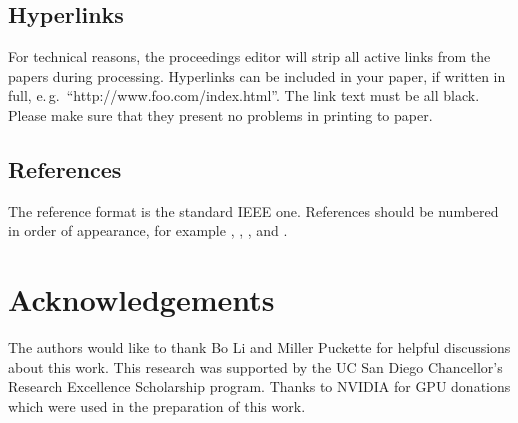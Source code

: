 \documentclass[a4paper]{article}
\begin{document}

\subsection{Hyperlinks}

For technical reasons, the proceedings editor will strip all active links from the papers during processing. Hyperlinks can be included in your paper, if written in full, e.\,g.\ ``http://www.foo.com/index.html''. The link text must be all black. 
Please make sure that they present no problems in printing to paper.

\subsection{References}

The reference format is the standard IEEE one. References should be numbered in order of appearance, for example \cite{Davis80-COP}, \cite{Rabiner89-ATO}, \cite[pp.\ 417--422]{Hastie09-TEO}, and \cite{YourName17-XXX}.

\section{Acknowledgements}

The authors would like to thank Bo Li and Miller Puckette for helpful discussions about this work. 
This research was supported by the UC San Diego Chancellor’s Research Excellence Scholarship program.
Thanks to NVIDIA for GPU donations which were used in the preparation of this work.






\end{document}

